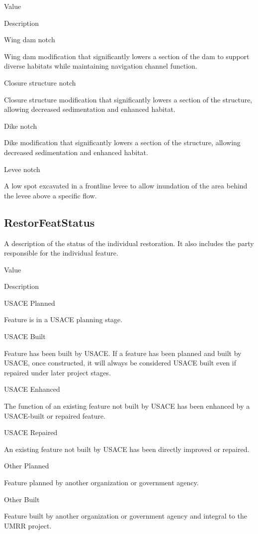 \documentclass[
  letterpaper,
  DIV=11,
  numbers=noendperiod]{scrreprt}
\begin{document}
Value

Description

Wing dam notch

Wing dam modification that significantly lowers a section of the dam to
support diverse habitats while maintaining navigation channel function.

Closure structure notch

Closure structure modification that significantly lowers a section of
the structure, allowing decreased sedimentation and enhanced habitat.

Dike notch

Dike modification that significantly lowers a section of the structure,
allowing decreased sedimentation and enhanced habitat.

Levee notch

A low spot excavated in a frontline levee to allow inundation of the
area behind the levee above a specific flow.

\subsection{RestorFeatStatus}\label{restorfeatstatus-9}

A description of the status of the individual restoration. It also
includes the party responsible for the individual feature.

Value

Description

USACE Planned

Feature is in a USACE planning stage.

USACE Built

Feature has been built by USACE. If a feature has been planned and built
by USACE, once constructed, it will always be considered USACE built
even if repaired under later project stages.

USACE Enhanced

The function of an existing feature not built by USACE has been enhanced
by a USACE-built or repaired feature.

USACE Repaired

An existing feature not built by USACE has been directly improved or
repaired.

Other Planned

Feature planned by another organization or government agency.

Other Built

Feature built by another organization or government agency and integral
to the UMRR project.
\end{document}
